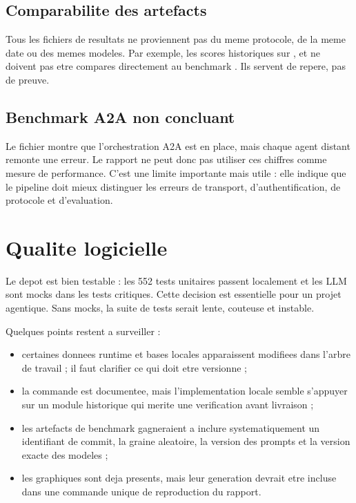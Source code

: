 \subsection{Comparabilite des artefacts}

Tous les fichiers de resultats ne proviennent pas du meme protocole, de la meme
date ou des memes modeles. Par exemple, les scores historiques sur
,  et  ne doivent pas
etre compares directement au benchmark . Ils servent de
repere, pas de preuve.

\subsection{Benchmark A2A non concluant}

Le fichier  montre que l'orchestration A2A est en
place, mais chaque agent distant remonte une erreur. Le rapport ne peut donc pas
utiliser ces chiffres comme mesure de performance. C'est une limite importante
mais utile : elle indique que le pipeline doit mieux distinguer les erreurs de
transport, d'authentification, de protocole et d'evaluation.

\section{Qualite logicielle}

Le depot est bien testable : les 552 tests unitaires passent localement et les
LLM sont mocks dans les tests critiques. Cette decision est essentielle pour un
projet agentique. Sans mocks, la suite de tests serait lente, couteuse et
instable.

Quelques points restent a surveiller :

\begin{itemize}
  \item certaines donnees runtime et bases locales apparaissent modifiees dans
  l'arbre de travail ; il faut clarifier ce qui doit etre versionne ;
  \item la commande  est documentee, mais l'implementation
  locale semble s'appuyer sur un module historique  qui
  merite une verification avant livraison ;
  \item les artefacts de benchmark gagneraient a inclure systematiquement un
  identifiant de commit, la graine aleatoire, la version des prompts et la
  version exacte des modeles ;
  \item les graphiques sont deja presents, mais leur generation devrait etre
  incluse dans une commande unique de reproduction du rapport.
\end{itemize}


